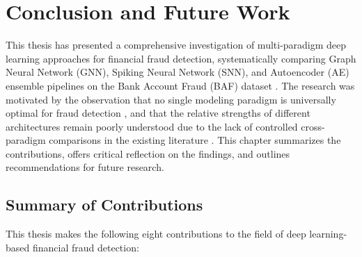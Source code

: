 \chapter{Conclusion and Future Work}
\label{ch:conclusion}

This thesis has presented a comprehensive investigation of multi-paradigm deep learning approaches for financial fraud detection, systematically comparing Graph Neural Network (GNN), Spiking Neural Network (SNN), and Autoencoder (AE) ensemble pipelines on the Bank Account Fraud (BAF) dataset \cite{jesus2022bank,feedzai2022baf}. The research was motivated by the observation that no single modeling paradigm is universally optimal for fraud detection \cite{singh2024comprehensive}, and that the relative strengths of different architectures remain poorly understood due to the lack of controlled cross-paradigm comparisons in the existing literature \cite{pourhabibi2022graph}. This chapter summarizes the contributions, offers critical reflection on the findings, and outlines recommendations for future research.

\section{Summary of Contributions}

This thesis makes the following eight contributions to the field of deep learning-based financial fraud detection:

